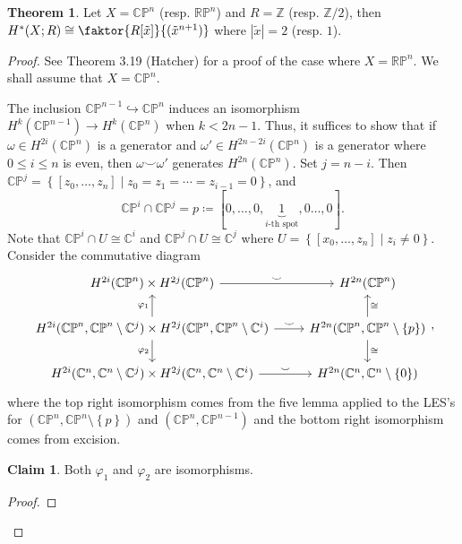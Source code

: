 \documentclass[10pt,letterpaper,cm]{nupset}
\theoremstyle{definition}
\theoremstyle{theorem}
\newtheorem{theorem}[definition]{Theorem}
\newtheorem*{claim}{Claim}
\theoremstyle{remark}
\newcommand{\C}{\mathbb C}
\newcommand{\CP}{\mathbb{CP}}
\newcommand{\RP}{\mathbb{RP}}
\newcommand{\Z}{\mathbb Z}
\newcommand{\1}{\mathbb{1}}
\newcommand{\0}{\vec 0}
\begin{document}
\begin{theorem}
Let $X = \CP^n$ (resp. $\RP^n$) and $R = \Z$ (resp. $\Z/2$), then $H^{\ast}(X; R) \cong \faktor{R[\tilde{x}]}{(\tilde{x}^{n+1})}$ where $\left\lvert{\tilde{x}}\right\rvert =2$ (resp. $1$).
\end{theorem}
\begin{proof}
See Theorem 3.19 (Hatcher) for a proof of the case where $X= \RP^n$. We shall assume that $X = \CP^n$.

\medskip

 The inclusion $\CP^{n-1} \hookrightarrow \CP^n$ induces an isomorphism $H^k(\CP^{n-1}) \to H^k(\CP^n)$ when $k < 2n-1$. Thus, it suffices to show that if $\omega \in H^{2i}(\CP^n)$ is a generator and $\omega ' \in H^{2n -2i}(\CP^n)$ is a generator where $0\leq i \leq n$ is even, then $\omega \smile \omega '$ generates $H^{2n}(\CP^n)$. Set $j = n-i$. Then $\CP^j = \left\{\left[z_0, \ldots, z_n\right] \mid z_0 = z_1 = \cdots = z_{i-1}= 0\right\}$, and $$\CP^i \cap \CP^j = p\coloneqq  \left[0, \ldots, 0, \underbrace{1}_{i\text{-th spot}}, 0 \ldots, 0\right].$$ Note that $\CP^i \cap U \cong \C^i$ and $\CP^j \cap U \cong \C^j$ where $U = \left\{\left[x_0, \ldots, z_n\right] \mid z_i \ne 0\right\}$. Consider the commutative diagram
\[
\begin{tikzcd}
H^{2i}(\CP^n)\times H^{2j}(\CP^n) \arrow[r, "\smile"]                                                                                              & H^{2n}(\CP^n)                                                                 \\
{H^{2i}(\CP^n, \CP^n \setminus \C^j)\times H^{2j}(\CP^n, \CP^n \setminus \C^i)} \arrow[r, "\smile"] \arrow[u, "\varphi_1"] \arrow[d, "\varphi_2"'] & {H^{2n}(\CP^n, \CP^n \setminus \{p\})} \arrow[u, "\cong"'] \arrow[d, "\cong"] \\
{H^{2i}(\C^n, \C^n \setminus \C^j)\times H^{2j}(\C^n, \C^n \setminus \C^i)} \arrow[r, "\smile"]                                                    & {H^{2n}(\C^n, \C^n \setminus \left\{0\right\})}                                         
\end{tikzcd}
,\] where the top right isomorphism comes from the five lemma applied to the LES's for $\left(\CP^n, \CP^n \setminus \left\{p\right\}\right)$ and $\left(\CP^n, \CP^{n-1}\right)$ and the bottom right isomorphism comes from excision. 
\begin{claim}
Both $\varphi_1$ and $\varphi_2$ are isomorphisms. 
\end{claim}
\begin{proof}

\end{proof}
\end{proof}
\end{document}
